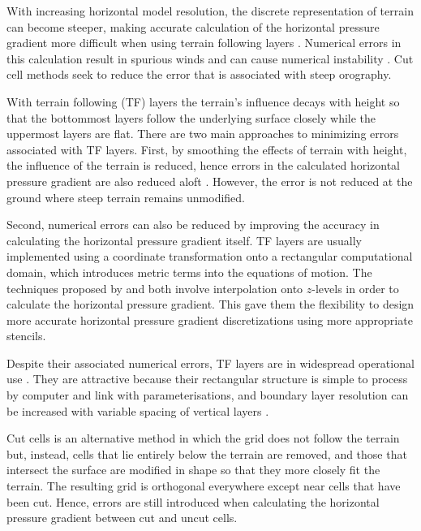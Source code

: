 \documentclass{ametsoc}
\begin{document}
With increasing horizontal model resolution, the discrete representation of terrain can become steeper, making accurate calculation of the horizontal pressure gradient more difficult when using terrain following layers \citep{gary1973,steppeler2002}.  Numerical errors in this calculation result in spurious winds and can cause numerical instability \citep{fast2003,webster2003}.  Cut cell methods seek to reduce the error that is associated with steep orography.

With terrain following (TF) layers the terrain's influence decays with height so that the bottommost layers follow the underlying surface closely while the uppermost layers are flat.  There are two main approaches to minimizing errors associated with TF layers.  First, by smoothing the effects of terrain with height, the influence of the terrain is reduced, hence errors in the calculated horizontal pressure gradient are also reduced aloft \citep{schaer2002,leuenberger2010,klemp2011}.  However, the error is not reduced at the ground where steep terrain remains unmodified.

Second, numerical errors can also be reduced by improving the accuracy in calculating the horizontal pressure gradient itself.  TF layers are usually implemented using a coordinate transformation onto a rectangular computational domain, which introduces metric terms into the equations of motion.  The techniques proposed by \citet{klemp2011} and \cite{zaengl2012} both involve interpolation onto $z$-levels in order to calculate the horizontal pressure gradient.  This gave them the flexibility to design more accurate horizontal pressure gradient discretizations using more appropriate stencils.

Despite their associated numerical errors, TF layers are in widespread operational use \citep{steppeler2003}.  They are attractive because their rectangular structure is simple to process by computer and link with parameterisations, and boundary layer resolution can be increased with variable spacing of vertical layers \citep{schaer2002}.

Cut cells is an alternative method in which the grid does not follow the terrain but, instead, cells that lie entirely below the terrain are removed, and those that intersect the surface are modified in shape so that they more closely fit the terrain.  The resulting grid is orthogonal everywhere except near cells that have been cut.  Hence, errors are still introduced when calculating the horizontal pressure gradient between cut and uncut cells.
\end{document}
